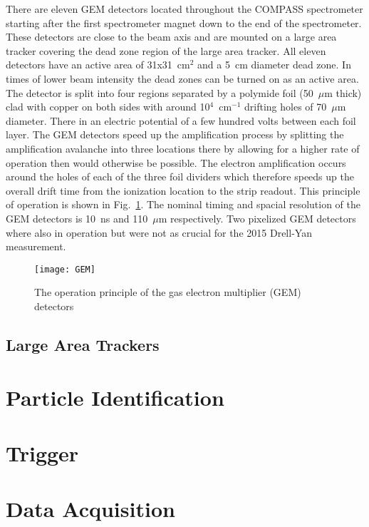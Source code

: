 There are eleven GEM detectors located throughout the COMPASS spectrometer
starting after the first spectrometer magnet down to the end of the
spectrometer.  These detectors are close to the beam axis and are mounted on a
large area tracker covering the dead zone region of the large area tracker.  All
eleven detectors have an active area of 31x31~cm$^2$ and a 5~cm diameter dead
zone.  In times of lower beam intensity the dead zones can be turned on as an
active area.  The detector is split into four regions separated by a polymide
foil (50~$\mu$m thick) clad with copper on both sides with around
10$^4$~cm$^{-1}$ drifting holes of 70~$\mu$m diameter.  There in an electric
potential of a few hundred volts between each foil layer.  The GEM detectors
speed up the amplification process by splitting the amplification avalanche into
three locations there by allowing for a higher rate of operation then would
otherwise be possible.  The electron amplification occurs around the holes of
each of the three foil dividers which therefore speeds up the overall drift time
from the ionization location to the strip readout.  This principle of operation
is shown in Fig.~\ref{fig::GEM}.  The nominal timing and spacial resolution of
the GEM detectors is 10~ns and 110~$\mu$m respectively.  Two pixelized GEM
detectors where also in operation but were not as crucial for the 2015 Drell-Yan
measurement.

\begin{figure}[h!t]
  \centering
  \texttt{[image: GEM]}
  \caption{The operation principle of the gas electron multiplier (GEM)
    detectors}
  \label{fig::GEM}
\end{figure}

\subsection{Large Area Trackers}





\section{Particle Identification}

\section{Trigger}

\section{Data Acquisition}

